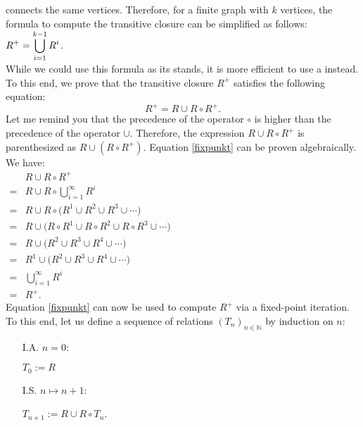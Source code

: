 connects the same vertices.  Therefore, for a finite graph with $k$ vertices, the formula to compute the
transitive closure can be simplified as follows:
\\[0.2cm]
\hspace*{1.3cm} 
$\displaystyle R^+ = \bigcup\limits_{i=1}^{k-1} R^i$.
\\[0.2cm]
While we could use this formula as its stands, it is more efficient to use a  instead.
To this end, we prove that the transitive closure $R^+$ satisfies the following equation:
\begin{equation}
  \label{fixpunkt}
  R^+ = R \cup R \circ R^+. 
\end{equation}
Let me remind you that the precedence of the operator $\circ$ 
is higher than the precedence of the operator $\cup$.  Therefore, the expression $R \cup R \circ R^+$ is parenthesized
as $R \cup (R \circ R^+)$.  Equation \ref{fixpunkt} can be proven algebraically.  We have:
\\[0.2cm]
\hspace*{1.3cm}
$
\begin{array}{cll}
    & R \cup R \circ R^+ \\[0.2cm]
  = & R \cup R \circ \bigcup\limits_{i=1}^{\infty} R^i \\[0.4cm]
  = & R \cup R \circ \bigl(R^1 \cup R^2 \cup R^3 \cup \cdots \bigr) \\[0.2cm]
  = & R \cup \bigl(R \circ R^1 \cup R \circ R^2 \cup R \circ R^3 \cup \cdots \bigr) \\[0.2cm]
  = & R \cup \bigl(R^2 \cup R^3 \cup  R^4 \cup \cdots \bigr)  \\[0.2cm]
  = & R^1 \cup \bigl(R^2 \cup R^3 \cup  R^4 \cup \cdots \bigr) \\[0.2cm]
  = & \bigcup\limits_{i=1}^{\infty} R^i \\[0.4cm]
  = & R^+.
\end{array}
$
\\[0.2cm]
Equation  \ref{fixpunkt} can now be used to compute $R^+$ via a fixed-point iteration.
To this end, let us define a sequence of relations $(T_n)_{n \in \mathbb{N}}$ by induction on $n$:
\begin{enumerate}
\item[I.A.] $n = 0$: 

            $T_0 := R$
\item[I.S.] $n \mapsto n+1$:

            $T_{n+1} := R \cup R \circ T_n$. 
\end{enumerate}
